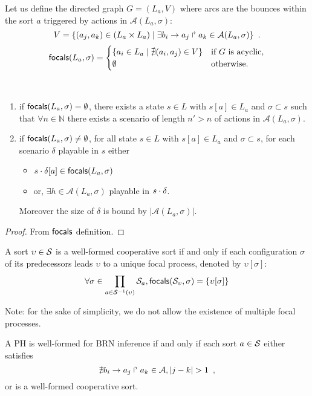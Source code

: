 \begin{definition}
Let us define the directed graph $G = (L_a, V)$ where arcs are the bounces within the sort $a$
triggered by actions in $\mathcal A(L_a,\sigma)$:
\[V = \{(a_j,a_k)\in (L_a \times L_a) \mid 
			\exists b_i\rightarrow a_j\Rsh a_k\in \mathcal A(L_a,\sigma)\}\enspace.\]
\[
\mathsf{focals}(L_a,\sigma) = 
\begin{cases}
\{ a_i \in L_a \mid \nexists (a_i,a_j)\in V\} & \text{if $G$ is acyclic},\\
\emptyset & \text{otherwise.}\\
\end{cases}
\]
\end{definition}
\begin{lemma}~
\begin{enumerate}
\item if $\mathsf{focals}(L_a,\sigma)=\emptyset$, there exists a 
state $s\in L$ with $s[a]\in L_a$ and $\sigma\subset s$
such that $\forall n\in\mathbb N$ there 
exists a scenario of length $n'>n$ of actions in $\mathcal A(L_a,\sigma)$.
\item if $\mathsf{focals}(L_a,\sigma)\neq\emptyset$, for all
state $s\in L$ with $s[a]\in L_a$ and $\sigma\subset s$, for each scenario $\delta$ playable in $s$
either
\begin{itemize}
\item $s\cdot\delta[a] \in \mathsf{focals}(L_a,\sigma)$
\item or, $\exists h\in \mathcal A(L_a,\sigma)$ playable in $s\cdot\delta$.
\end{itemize}
Moreover the size of $\delta$ is bound by $|\mathcal A(L_a,\sigma)|$.
\end{enumerate}
\end{lemma}
\begin{proof}
From $\mathsf{focals}$ definition.
\end{proof}
\begin{property}
A sort $\upsilon\in\mathcal{S}$ is a well-formed cooperative sort if and only if
each configuration $\sigma$ of its predecessors leads $\upsilon$ to a unique focal process,
denoted by $\upsilon[\sigma]$:
\[
\forall \sigma \in \prod_{a\in\mathcal{S}^{-1}(\upsilon)} \mathcal{S}_{a},
\mathsf{focals}(\mathcal{S}_\upsilon,\sigma) = \{ \upsilon[\sigma] \}\]
\end{property}
Note: for the sake of simplicity, we do not allow the existence of multiple focal processes.

\begin{property}
A PH is well-formed for BRN inference if and only if each sort $a\in\mathcal{S}$ either satisfies
\[\nexists b_i\rightarrow a_j\Rsh a_k\in\mathcal{A}, |j-k| > 1
\enspace,\]
or is a well-formed cooperative sort.
\end{property}

